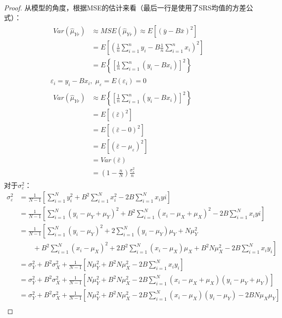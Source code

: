 \begin{proof}
	从模型的角度，根据MSE的估计来看（最后一行是使用了SRS均值的方差公式）：
	\begin{gather*}
		\begin{aligned}
			Var(\hat{\mu}_{Yr})&\approx MSE(\hat{\mu}_{Yr})
			\approx E\left[(\bar{y}-B\bar{x})^2\right] \\
			&=E\left[\left(\frac{1}{n}\sum_{i=1}^ny_i-B\frac{1}{n}\sum_{i=1}^nx_i\right)^2\right] \\
			&=E\left\{\left[\frac{1}{n}\sum_{i=1}^n(y_i-Bx_i)\right]^2\right\}
		\end{aligned} \\
		\varepsilon_i=y_i-Bx_i,\;\mu_\varepsilon=E(\varepsilon_i)=0 \\
		\begin{aligned}
			Var(\hat{\mu}_{Yr})
			&\approx E\left\{\left[\frac{1}{n}\sum_{i=1}^n(y_i-Bx_i)\right]^2\right\} \\
			&=E\left[(\bar{\varepsilon})^2\right] \\
			&=E\left[(\bar{\varepsilon}-0)^2\right] \\
			&=E\left[(\bar{\varepsilon}-\mu_\varepsilon)^2\right] \\
			&=Var(\bar{\varepsilon}) \\
			&=\left(1-\frac{n}{N}\right)\frac{\sigma_\varepsilon^2}{n}
		\end{aligned}
	\end{gather*}
	对于$\sigma_\varepsilon^2$：
	\begin{align*}
		\sigma_\varepsilon^2
		&=\frac{1}{N-1}\left[\sum_{i=1}^Ny_i^2+B^2\sum_{i=1}^Nx_i^2-2B\sum_{i=1}^Nx_iyi\right] \\
		&=\frac{1}{N-1}\left[\sum_{i=1}^N(y_i-\mu_Y+\mu_Y)^2+B^2\sum_{i=1}^N(x_i-\mu_X+\mu_X)^2-2B\sum_{i=1}^Nx_iyi\right] \\
		&=\frac{1}{N-1}\left[\sum_{i=1}^N(y_i-\mu_Y)^2+2\sum_{i=1}^N(y_i-\mu_Y)\mu_Y+N\mu_Y^2\right.\\
		&\left.\qquad+B^2\sum_{i=1}^N(x_i-\mu_X)^2+2B^2\sum_{i=1}^N(x_i-\mu_X)\mu_X+B^2N\mu_X^2-2B\sum_{i=1}^Nx_iy_i\right] \\
		&=\sigma_Y^2+B^2\sigma_X^2+\frac{1}{N-1}\left[N\mu_Y^2+B^2N\mu_X^2-2B\sum_{i=1}^Nx_iy_i\right] \\
		&=\sigma_Y^2+B^2\sigma_X^2+\frac{1}{N-1}\left[N\mu_Y^2+B^2N\mu_X^2-2B\sum_{i=1}^N(x_i-\mu_X+\mu_X)(y_i-\mu_Y+\mu_Y)\right] \\
		&=\sigma_Y^2+B^2\sigma_X^2+\frac{1}{N-1}\left[N\mu_Y^2+B^2N\mu_X^2-2B\sum_{i=1}^N(x_i-\mu_X)(y_i-\mu_Y)-2BN\mu_X\mu_Y\right] \\

\end{align*}
\end{proof}
